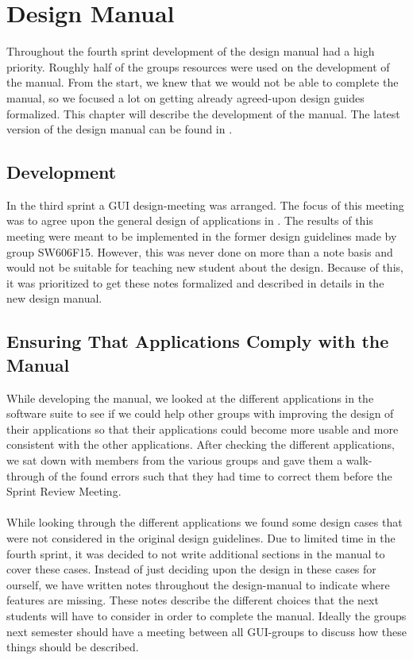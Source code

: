 
\chapter{Design Manual}
\label{cha:design_manual}

Throughout the fourth sprint development of the design manual had a high priority. Roughly half of the groups resources were used on the development of the manual. From the start, we knew that we would not be able to complete the manual, so we focused a lot on getting already agreed-upon design guides formalized. This chapter will describe the development of the manual. The latest version of the design manual can be found in .

\section{Development}
\label{sec:development}
In the third sprint a GUI design-meeting was arranged. The focus of this meeting was to agree upon the general design of applications in \giraf. The results of this meeting were meant to be implemented in the former design guidelines made by group SW606F15. However, this was never done on more than a note basis and would not be suitable for teaching new student about the design. Because of this, it was prioritized to get these notes formalized and described in details in the new design manual. 

\section{Ensuring That Applications Comply with the Manual}
\label{sec:ensuring_that_applications_comply_with_the_manual}
While developing the manual, we looked at the different applications in the \giraf software suite to see if we could help other groups with improving the design of their applications so that their applications could become more usable and more consistent with the other applications. After checking the different applications, we sat down with members from the various groups and gave them a walk-through of the found errors such that they had time to correct them before the Sprint Review Meeting. 
\\\\
While looking through the different applications we found some design cases that were not considered in the original design guidelines. Due to limited time in the fourth sprint, it was decided to not write additional sections in the manual to cover these cases. Instead of just deciding upon the design in these cases for ourself, we have written notes throughout the design-manual to indicate where features are missing. These notes describe the different choices that the next students will have to consider in order to complete the manual. Ideally the groups next semester should have a meeting between all GUI-groups to discuss how these things should be described.